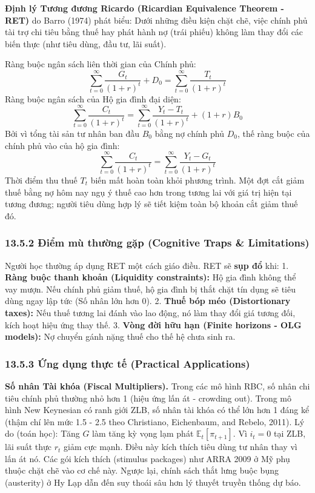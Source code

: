 \documentclass[
]{article}
\begin{document}
\textbf{Định lý Tương đương Ricardo (Ricardian Equivalence Theorem -
RET)} do Barro (1974) phát biểu: Dưới những điều kiện chặt chẽ, việc
chính phủ tài trợ chi tiêu bằng thuế hay phát hành nợ (trái phiếu) không
làm thay đổi các biến thực (như tiêu dùng, đầu tư, lãi suất).

Ràng buộc ngân sách liên thời gian của Chính phủ:
\[ \sum_{t=0}^\infty \frac{G_t}{(1+r)^t} + D_0 = \sum_{t=0}^\infty \frac{T_t}{(1+r)^t} \]
Ràng buộc ngân sách của Hộ gia đình đại diện:
\[ \sum_{t=0}^\infty \frac{C_t}{(1+r)^t} = \sum_{t=0}^\infty \frac{Y_t - T_t}{(1+r)^t} + (1+r)B_0 \]
Bởi vì tổng tài sản tư nhân ban đầu \(B_0\) bằng nợ chính phủ \(D_0\),
thế ràng buộc của chính phủ vào của hộ gia đình:
\[ \sum_{t=0}^\infty \frac{C_t}{(1+r)^t} = \sum_{t=0}^\infty \frac{Y_t - G_t}{(1+r)^t} \]
Thời điểm thu thuế \(T_t\) biến mất hoàn toàn khỏi phương trình. Một đợt
cắt giảm thuế bằng nợ hôm nay ngụ ý thuế cao hơn trong tương lai với giá
trị hiện tại tương đương; người tiêu dùng hợp lý sẽ tiết kiệm toàn bộ
khoản cắt giảm thuế đó.

\subsubsection{13.5.2 Điểm mù thường gặp (Cognitive Traps \&
Limitations)}\label{ux111iux1ec3m-muxf9-thux1b0ux1eddng-gux1eb7p-cognitive-traps-limitations-94}

Người học thường áp dụng RET một cách giáo điều. RET sẽ \textbf{sụp đổ}
khi: 1. \textbf{Ràng buộc thanh khoản (Liquidity constraints):} Hộ gia
đình không thể vay mượn. Nếu chính phủ giảm thuế, hộ gia đình bị thắt
chặt tín dụng sẽ tiêu dùng ngay lập tức (Số nhân lớn hơn 0). 2.
\textbf{Thuế bóp méo (Distortionary taxes):} Nếu thuế tương lai đánh vào
lao động, nó làm thay đổi giá tương đối, kích hoạt hiệu ứng thay thế. 3.
\textbf{Vòng đời hữu hạn (Finite horizons - OLG models):} Nợ chuyển gánh
nặng thuế cho thế hệ chưa sinh ra.

\subsubsection{13.5.3 Ứng dụng thực tế (Practical
Applications)}\label{ux1ee9ng-dux1ee5ng-thux1ef1c-tux1ebf-practical-applications-50}

\textbf{Số nhân Tài khóa (Fiscal Multipliers).} Trong các mô hình RBC,
số nhân chi tiêu chính phủ thường nhỏ hơn 1 (hiệu ứng lấn át - crowding
out). Trong mô hình New Keynesian có ranh giới ZLB, số nhân tài khóa có
thể lớn hơn 1 đáng kể (thậm chí lên mức 1.5 - 2.5 theo Christiano,
Eichenbaum, and Rebelo, 2011). Lý do (toán học): Tăng \(G\) làm tăng kỳ
vọng lạm phát \(\mathbb{E}_t[\pi_{t+1}]\). Vì \(i_t = 0\) tại ZLB, lãi
suất thực \(r_t\) giảm cực mạnh. Điều này kích thích tiêu dùng tư nhân
thay vì lấn át nó. Các gói kích thích (stimulus packages) như ARRA 2009
ở Mỹ phụ thuộc chặt chẽ vào cơ chế này. Ngược lại, chính sách thắt lưng
buộc bụng (austerity) ở Hy Lạp dẫn đến suy thoái sâu hơn lý thuyết
truyền thống dự báo.
\end{document}
